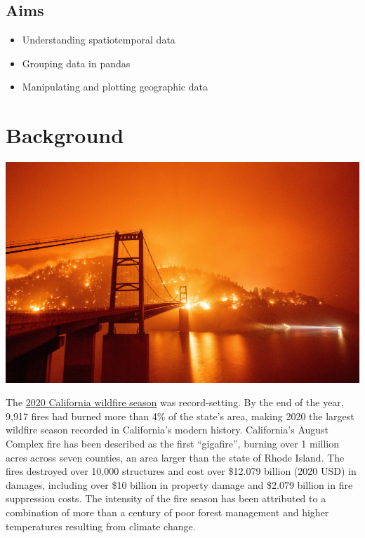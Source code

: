 \documentclass[
  letterpaper,
  DIV=11,
  numbers=noendperiod]{scrreprt}
\providecommand{\tightlist}{%
  \setlength{\itemsep}{0pt}\setlength{\parskip}{0pt}}\usepackage{longtable,booktabs,array}
\begin{document}
\hypertarget{aims-1}{%
\subsection{Aims}\label{aims-1}}

\begin{itemize}
\tightlist
\item
  Understanding spatiotemporal data
\item
  Grouping data in pandas
\item
  Manipulating and plotting geographic data
\end{itemize}

\hypertarget{background}{%
\section{Background}\label{background}}

\includegraphics{index_files/mediabag/106695701-1599664926.jpg}

The \href{https://en.wikipedia.org/wiki/2020_California_wildfires}{2020
California wildfire season} was record-setting. By the end of the year,
9,917 fires had burned more than 4\% of the state's area, making 2020
the largest wildfire season recorded in California's modern history.
California's August Complex fire has been described as the first
``gigafire'', burning over 1 million acres across seven counties, an
area larger than the state of Rhode Island. The fires destroyed over
10,000 structures and cost over \$12.079 billion (2020 USD) in damages,
including over \$10 billion in property damage and \$2.079 billion in
fire suppression costs. The intensity of the fire season has been
attributed to a combination of more than a century of poor forest
management and higher temperatures resulting from climate change.
\end{document}
